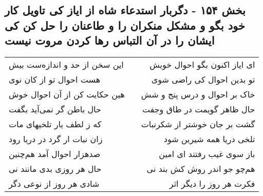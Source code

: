 \begin{center}
\section*{بخش ۱۵۴ - دگربار استدعاء شاه از ایاز کی تاویل کار خود بگو و مشکل منکران را و طاعنان را حل کن کی ایشان را در آن التباس رها کردن مروت نیست}
\label{sec:sh154}
\begin{longtable}{l p{0.5cm} r}
این سخن از حد و اندازه‌ست بیش
&&
ای ایاز اکنون بگو احوال خویش
\\
هست احوال تو از کان نوی
&&
تو بدین احوال کی راضی شوی
\\
هین حکایت کن از آن احوال خوش
&&
خاک بر احوال و درس پنج و شش
\\
حال باطن گر نمی‌آید بگفت
&&
حال ظاهر گویمت در طاق وجفت
\\
که ز لطف یار تلخیهای مات
&&
گشت بر جان خوشتر از شکرنبات
\\
زان نبات ار گرد در دریا رود
&&
تلخی دریا همه شیرین شود
\\
صدهزار احوال آمد هم‌چنین
&&
باز سوی غیب رفتند ای امین
\\
حال هر روزی بدی مانند نی
&&
هم‌چو جو اندر روش کش بند نی
\\
شادی هر روز از نوعی دگر
&&
فکرت هر روز را دیگر اثر
\\
\end{longtable}
\end{center}
